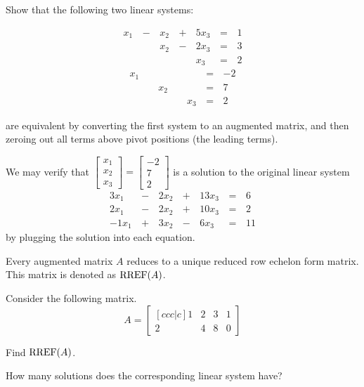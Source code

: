 \begin{applicationActivities}{2}{4}
\begin{activity}{10}
  Show that the following two linear systems:
  \begin{multicols}{2}\noindent
    \begin{alignat*}{4}
       x_1 &\,-\,&  x_2  &\,+\,&  5x_3 &\,=\,& 1 \\
           &\, \,&  x_2 &\,-\,&  2x_3 &\,=\,& 3 \\
           &\, \,&      &\, \,&   x_3 &\,=\,& 2
    \end{alignat*}
      \begin{alignat*}{4}
         x_1 &\, \,&      &\, \,&       &\,=\,& -2 \\
             &\, \,&  x_2 &\, \,&       &\,=\,& 7 \\
             &\, \,&      &\, \,&   x_3 &\,=\,& 2
      \end{alignat*}
  \end{multicols}
  are equivalent by converting the first system to an augmented matrix,
  and then zeroing out all terms above pivot positions (the leading terms).
\end{activity}

\begin{remark}
  We may verify that \(\begin{bmatrix}x_1\\x_2\\x_3\end{bmatrix}=
  \begin{bmatrix}-2\\7\\2\end{bmatrix}\) is a solution to the
  original linear system
    \begin{alignat*}{4}
      3x_1 &\,-\,& 2x_2 &\,+\,& 13x_3 &\,=\,& 6 \\
      2x_1 &\,-\,& 2x_2 &\,+\,& 10x_3 &\,=\,& 2 \\
     -1x_1 &\,+\,& 3x_2 &\,-\,&  6x_3 &\,=\,& 11
    \end{alignat*}
  by plugging the solution into each equation.
\end{remark}

\begin{fact}
  Every augmented matrix \(A\) reduces to a unique reduced row echelon form
  matrix. This matrix is denoted as \(\operatorname{RREF}(A)\).
\end{fact}

\begin{activity}{10}
  Consider the following matrix.
  \[
    A = \begin{bmatrix}[ccc|c]
      1 & 2 & 3 & 1\\
      2 & 4 & 8 & 0
    \end{bmatrix}
  \]
  \begin{subactivity}
    Find \(\operatorname{RREF}(A)\).
  \end{subactivity}
  \begin{subactivity}
    How many solutions does the corresponding linear system have?
  \end{subactivity}
\end{activity}





\end{applicationActivities}
